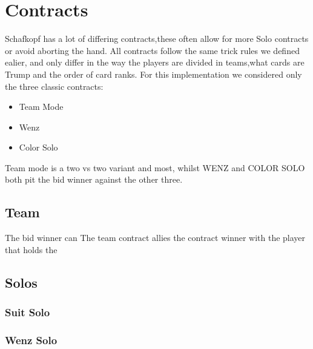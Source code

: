 \section{Contracts}
Schafkopf has a lot of differing contracts,these often allow for more Solo contracts or avoid aborting the hand.
All contracts follow the same trick rules we defined ealier, and only differ in the way the players are divided in
teams,what cards are Trump and the order of card ranks.
For this implementation we considered only the three classic contracts:
\begin{itemize}
    \item Team Mode
    \item Wenz
    \item Color Solo
\end{itemize}
Team mode is a two vs two variant and most, whilst WENZ and COLOR SOLO both pit the bid winner against the other three.
\subsection{Team}
The bid winner can The team contract allies the contract winner with the player that holds the
\subsection{Solos}
\subsubsection{Suit Solo}
\subsubsection{Wenz Solo}

